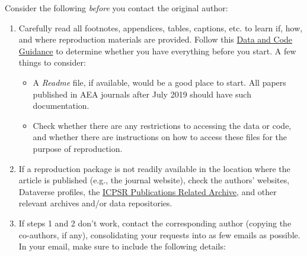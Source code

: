 \documentclass[]{book}
\providecommand{\tightlist}{%
  \setlength{\itemsep}{0pt}\setlength{\parskip}{0pt}}
\begin{document}
Consider the following \emph{before} you contact the original author:

\begin{enumerate}
\def\labelenumi{\arabic{enumi}.}
\item
  Carefully read all footnotes, appendices, tables, captions, etc. to learn if, how, and where reproduction materials are provided. Follow this \href{https://social-science-data-editors.github.io/guidance/Verification_guidance.html}{Data and Code Guidance} to determine whether you have everything before you start. A few things to consider:

  \begin{itemize}
  \tightlist
  \item
    A \emph{Readme} file, if available, would be a good place to start. All papers published in AEA journals after July 2019 should have such documentation.\\
  \item
    Check whether there are any restrictions to accessing the data or code, and whether there are instructions on how to access these files for the purpose of reproduction.
  \end{itemize}
\item
  If a reproduction package is not readily available in the location where the article is published (e.g., the journal website), check the authors' websites, Dataverse profiles, the \href{https://www.icpsr.umich.edu/icpsrweb/}{ICPSR Publications Related Archive}, and other relevant archives and/or data repositories.
\item
  If steps 1 and 2 don't work, contact the corresponding author (copying the co-authors, if any), consolidating your requests into as few emails as possible. In your email, make sure to include the following details:


\end{enumerate}
\end{document}
